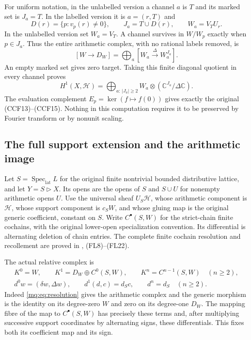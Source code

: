 \documentclass[11pt,a4paper]{article}
\theoremstyle{definition}\newtheorem{definition}[theorem]{Definition}
\newcommand{\C}{\mathbb C}\newcommand{\R}{\mathbb R}
\newcommand{\SpecLat}{\operatorname{Spec}_{\mathrm{lat}}}
\begin{document}
For uniform notation, in the unlabelled version a channel $a$ is
$T$ and its marked set is $J_a=T$. In the labelled version it is
$a=(r,T)$ and
\[
 D(r)=\{p:v_p(r)\ne0\},\qquad J_a=T\cup D(r),
 \qquad W_a=V_TU_r.
 \tag{MQ6}\label{mq:eq:marked-set}
\]
In the unlabelled version set $W_a=V_T$. A channel survives in
$W/W_p$ exactly when $p\in J_a$. Thus the entire arithmetic
complex, with no rational labels removed, is
\[
 [W\longrightarrow D_W]
   =\bigoplus_a[W_a\xrightarrow{\Delta}W_a^{J_a}].
 \tag{MQ7}\label{mq:eq:channel-complex}
\]
An empty marked set gives zero target. Taking this finite diagonal
quotient in every channel proves
\[
 H^1(X,\mathcal H)
   =\bigoplus_{a:\,|J_a|\ge2}
       W_a\otimes(\C^{J_a}/\Delta\C).
 \tag{MQ8}\label{mq:eq:full-mixed-cohomology}
\]
The evaluation complement $E_p=\ker(f\mapsto f(0))$ gives exactly
the original (CCF13)--(CCF15). Nothing in this computation requires
it to be preserved by Fourier transform or by nonunit scaling.

\subsection{The full support extension and the arithmetic image}

Let $S=\SpecLat L$ for the original finite nontrivial bounded
distributive lattice, and let $Y=S\triangleright X$. Its opens are
the opens of $S$ and $S\cup U$ for nonempty arithmetic opens $U$.
Use the universal sheaf $U_S\mathcal H$, whose arithmetic component
is $\mathcal H$, whose support component is $c_SW$, and whose
gluing map is the original generic coefficient, constant on $S$.
Write $C^\bullet(S,W)$ for the strict-chain finite cochains, with
the original lower-open specialization convention. Its differential
is alternating deletion of chain entries. The complete finite
cochain resolution and recollement are proved in
, (FL8)--(FL22).

The actual relative complex is
\[
 \begin{gathered}
 K^0=W,\qquad K^1=D_W\oplus C^0(S,W),\qquad
 K^n=C^{n-1}(S,W)\quad(n\ge2),\\
 d^0w=(\delta w,\Delta w),\qquad
 d^1(d,c)=d_Sc,\qquad d^n=d_S\quad(n\ge2).
 \end{gathered}
 \tag{MQ9}\label{mq:eq:relative-complex}
\]
Indeed \eqref{mq:eq:resolution} gives the arithmetic complex and
the generic morphism is the identity on its degree-zero $W$ and
zero on its degree-one $D_W$. The mapping fibre of the map to
$C^\bullet(S,W)$ has precisely these terms and, after multiplying
successive support coordinates by alternating signs, these
differentials. This fixes both its coefficient map and its sign.
\end{document}
